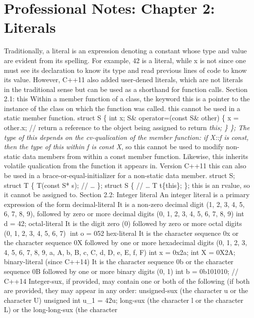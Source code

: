 \hypertarget{professional-notes-chapter-2-literals}{%
\chapter{Professional Notes: Chapter 2:
Literals}\label{professional-notes-chapter-2-literals}}

Traditionally, a literal is an expression denoting a constant whose type
and value are evident from its spelling. For example, 42 is a literal,
while x is not since one must see its declaration to know its type and
read previous lines of code to know its value. However, C++11 also added
user-dened literals, which are not literals in the traditional sense but
can be used as a shorthand for function calls. Section 2.1: this Within
a member function of a class, the keyword this is a pointer to the
instance of the class on which the function was called. this cannot be
used in a static member function. struct S \{ int x; S\& operator=(const
S\& other) \{ x = other.x; // return a reference to the object being
assigned to return \emph{this; \} \}; The type of this depends on the
cv-qualication of the member function: if X::f is const, then the type
of this within f is const X}, so this cannot be used to modify
non-static data members from within a const member function. Likewise,
this inherits volatile qualication from the function it appears in.
Version C++11 this can also be used in a brace-or-equal-initializer for
a non-static data member. struct S; struct T \{ T(const S* s); //
\ldots{} \}; struct S \{ // \ldots{} T t\{this\}; \}; this is an rvalue,
so it cannot be assigned to. Section 2.2: Integer literal An integer
literal is a primary expression of the form decimal-literal It is a
non-zero decimal digit (1, 2, 3, 4, 5, 6, 7, 8, 9), followed by zero or
more decimal digits (0, 1, 2, 3, 4, 5, 6, 7, 8, 9) int d = 42;
octal-literal It is the digit zero (0) followed by zero or more octal
digits (0, 1, 2, 3, 4, 5, 6, 7) int o = 052 hex-literal It is the
character sequence 0x or the character sequence 0X followed by one or
more hexadecimal digits (0, 1, 2, 3, 4, 5, 6, 7, 8, 9, a, A, b, B, c, C,
d, D, e, E, f, F) int x = 0x2a; int X = 0X2A; binary-literal (since
C++14) It is the character sequence 0b or the character sequence 0B
followed by one or more binary digits (0, 1) int b = 0b101010; // C++14
Integer-sux, if provided, may contain one or both of the following (if
both are provided, they may appear in any order: unsigned-sux (the
character u or the character U) unsigned int u\_1 = 42u; long-sux (the
character l or the character L) or the long-long-sux (the character
